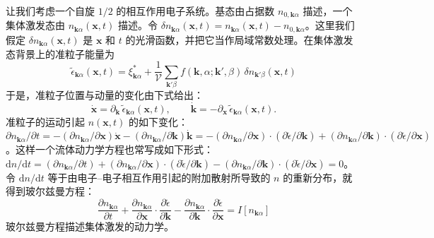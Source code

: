 让我们考虑一个自旋 $1/2$ 的相互作用电子系统。基态由占据数 $n_{0,\pmb{k}\alpha}$ 描述，一个集体激发态由 $n_{\pmb{k}\alpha}(\pmb{x},t)$ 描述。令 $\delta n_{\pmb{k}\alpha}(\pmb{x},t) = n_{\pmb{k}\alpha}(\pmb{x},t) - n_{0,\pmb{k}\alpha}$。这里我们假定 $\delta n_{\pmb{k}\alpha}(\pmb{x},t)$ 是 $\pmb{x}$ 和 $t$ 的光滑函数，并把它当作局域常数处理。在集体激发态背景上的准粒子能量为
\begin{equation*}
\tilde{\epsilon}_{\pmb{k}\alpha}(\pmb{x},t) = \xi^{*}_{\pmb{k}\alpha} + \frac{1}{\mathcal{V}} \sum_{\pmb{k}'\beta} f(\pmb{k},\alpha;\pmb{k}',\beta)\, \delta n_{\pmb{k}'\beta}(\pmb{x},t) \tag{5.3.3}
\end{equation*}
于是，准粒子位置与动量的变化由下式给出：
\begin{equation*}
\dot{\pmb{x}} = \partial_{\pmb{k}}\, \tilde{\epsilon}_{\pmb{k}\alpha}(\pmb{x},t), \qquad \dot{\pmb{k}} = -\partial_{\pmb{x}}\, \tilde{\epsilon}_{\pmb{k}\alpha}(\pmb{x},t). \tag{5.3.4}
\end{equation*}
准粒子的运动引起 $n(\pmb{x},t)$ 的如下变化：$\partial n_{\pmb{k}\alpha}/\partial t = -(\partial n_{\pmb{k}\alpha}/\partial \pmb{x})\dot{\pmb{x}} - (\partial n_{\pmb{k}\alpha}/\partial \pmb{k})\dot{\pmb{k}} = -(\partial n_{\pmb{k}\alpha}/\partial \pmb{x})\cdot(\partial\tilde{\epsilon}/\partial \pmb{k}) + (\partial n_{\pmb{k}\alpha}/\partial \pmb{k})\cdot(\partial\tilde{\epsilon}/\partial \pmb{x})$。这样一个流体动力学方程也常写成如下形式：$\mathrm{d}n/\mathrm{d}t = (\partial n_{\pmb{k}\alpha}/\partial t) + (\partial n_{\pmb{k}\alpha}/\partial \pmb{x})\cdot(\partial\tilde{\epsilon}/\partial \pmb{k}) - (\partial n_{\pmb{k}\alpha}/\partial \pmb{k})\cdot(\partial\tilde{\epsilon}/\partial \pmb{x}) = 0$。令 $\mathrm{d}n/\mathrm{d}t$ 等于由电子--电子相互作用引起的附加散射所导致的 $n$ 的重新分布，就得到玻尔兹曼方程：
\begin{equation*}
\frac{\partial n_{\pmb{k}\alpha}}{\partial t} + \frac{\partial n_{\pmb{k}\alpha}}{\partial \pmb{x}} \cdot \frac{\partial \tilde{\epsilon}}{\partial \pmb{k}} - \frac{\partial n_{\pmb{k}\alpha}}{\partial \pmb{k}} \cdot \frac{\partial \tilde{\epsilon}}{\partial \pmb{x}} = I[n_{\pmb{k}\alpha}]
\end{equation*}
玻尔兹曼方程描述集体激发的动力学。

